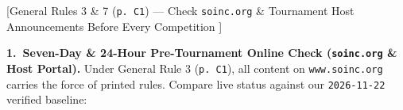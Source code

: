 \setcounter{chapter}{5}
[General Rules 3 \& 7 (\texttt{p.\ C1}) --- Check \texttt{soinc.org} \& Tournament Host Announcements Before Every Competition {}]

\par\noindent\textbf{1.\ Seven-Day \& 24-Hour Pre-Tournament Online Check (\texttt{soinc.org} \& Host Portal).}
Under General Rule 3 (\texttt{p.\ C1}), all content on \texttt{www.soinc.org} carries the force of printed rules. Compare live status against our \texttt{2026-11-22} verified baseline:
\par\smallskip\noindent

